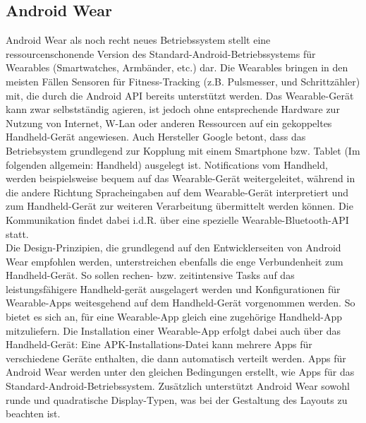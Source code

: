 \subsection{Android Wear}
Android Wear als noch recht neues Betriebssystem stellt eine ressourcenschonende Version des Standard-Android-Betriebssystems für Wearables (Smartwatches, Armbänder, etc.) dar. Die Wearables bringen in den meisten Fällen Sensoren für Fitness-Tracking (z.B. Pulsmesser, und Schrittzähler) mit, die durch die Android API bereits unterstützt werden. Das Wearable-Gerät kann zwar selbstständig agieren, ist jedoch ohne entsprechende Hardware zur Nutzung von Internet, W-Lan oder anderen Ressourcen auf ein gekoppeltes Handheld-Gerät angewiesen. Auch Hersteller Google betont, dass das Betriebsystem grundlegend zur Kopplung mit einem Smartphone bzw. Tablet (Im folgenden allgemein: Handheld) ausgelegt ist. Notifications vom Handheld, werden beispielsweise bequem auf das Wearable-Gerät weitergeleitet, während in die andere Richtung Spracheingaben auf dem Wearable-Gerät interpretiert und zum Handheld-Gerät zur weiteren Verarbeitung übermittelt werden können. Die Kommunikation findet dabei i.d.R. über eine spezielle Wearable-Bluetooth-API statt.
\\[0.5cm]
Die Design-Prinzipien, die grundlegend auf den Entwicklerseiten von Android Wear empfohlen werden, unterstreichen ebenfalls die enge Verbundenheit zum Handheld-Gerät. So sollen rechen- bzw. zeitintensive Tasks auf das leistungsfähigere Handheld-gerät ausgelagert werden und Konfigurationen für Wearable-Apps weitesgehend auf dem Handheld-Gerät vorgenommen werden. So bietet es sich an, für eine Wearable-App gleich eine zugehörige Handheld-App mitzuliefern. Die Installation einer Wearable-App erfolgt dabei auch über das Handheld-Gerät: Eine APK-Installations-Datei kann mehrere Apps für verschiedene Geräte enthalten, die dann automatisch verteilt werden. Apps für Android Wear werden unter den gleichen Bedingungen erstellt, wie Apps für das Standard-Android-Betriebssystem. Zusätzlich unterstützt Android Wear sowohl runde und quadratische Display-Typen, was bei der Gestaltung des Layouts zu beachten ist.

